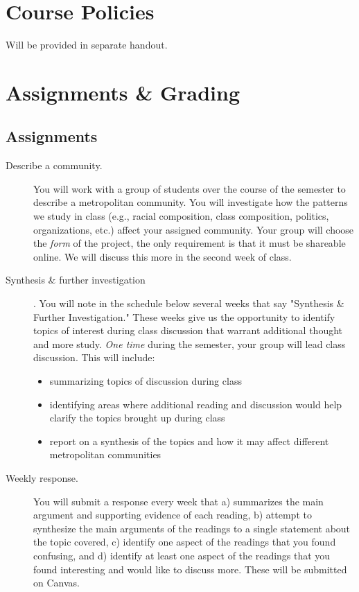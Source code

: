 \documentclass[11pt]{syllabus}
\begin{document}
\section{Course Policies}

Will be provided in separate handout.

\section{Assignments \& Grading}
\subsection{Assignments}
\begin{description}
\item[Describe a community.] You will work with a group of students over the course of the semester to describe a metropolitan community. You will investigate how the patterns we study in class (e.g., racial composition, class composition, politics, organizations, etc.) affect your assigned community. Your group will choose the \emph{form} of the project, the only requirement is that it must be shareable online. We will discuss this more in the second week of class. 

\item[Synthesis \& further investigation]. You will note in the schedule below several weeks that say "Synthesis \& Further Investigation." These weeks give us the opportunity to identify topics of interest during class discussion that warrant additional thought and more study. \emph{One time} during the semester, your group will lead class discussion. This will include:

\begin{itemize}
    \item summarizing topics of discussion during class
    \item identifying areas where additional reading and discussion would help clarify the topics brought up during class
    \item report on a synthesis of the topics and how it may affect different metropolitan communities
\end{itemize}

\item[Weekly response.] You will submit a response every week that a) summarizes the main argument and supporting evidence of each reading, b) attempt to synthesize the main arguments of the readings to a single statement about the topic covered, c) identify one aspect of the readings that you found confusing, and d) identify at least one aspect of the readings that you found interesting and would like to discuss more. These will be submitted on Canvas.


\end{description}
\end{document}
